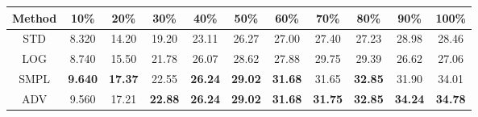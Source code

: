 \documentclass{standalone}
\begin{document}
\begin{tabular}{c|cccccccccc}
      \toprule
      Method & 10\% & 20\% & 30\% & 40\% & 50\% & 60\% & 70\% & 80\% & 90\% & 100\% \\
      \midrule
STD & 8.320 & 14.20 & 19.20 & 23.11 & 26.27 & 27.00 & 27.40 & 27.23 & 28.98 & 28.46\\
LOG & 8.740 & 15.50 & 21.78 & 26.07 & 28.62 & 27.88 & 29.75 & 29.39 & 26.62 & 27.06\\
SMPL & \textbf{9.640} & \textbf{17.37} & 22.55 & \textbf{26.24} & \textbf{29.02} & \textbf{31.68} & 31.65 & \textbf{32.85} & 31.90 & 34.01\\
ADV & 9.560 & 17.21 & \textbf{22.88} & \textbf{26.24} & \textbf{29.02} & \textbf{31.68} & \textbf{31.75} & \textbf{32.85} & \textbf{34.24} & \textbf{34.78}\\
  \bottomrule
\end{tabular}
\end{document}

